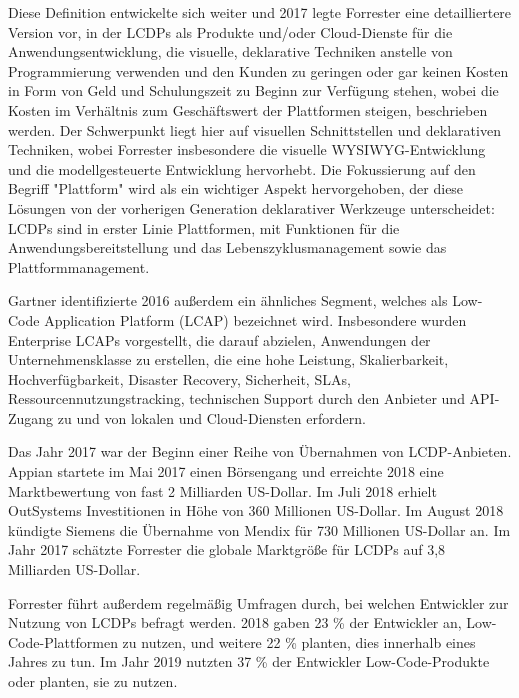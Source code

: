 \documentclass[12pt]{article} %
\begin{document}
	Diese Definition entwickelte sich weiter und 2017 legte Forrester eine detailliertere Version vor, in der LCDPs als Produkte und/oder Cloud-Dienste für die Anwendungsentwicklung, die visuelle, deklarative Techniken anstelle von Programmierung verwenden und den Kunden zu geringen oder gar keinen Kosten in Form von Geld und Schulungszeit zu Beginn zur Verfügung stehen, wobei die Kosten im Verhältnis zum Geschäftswert der Plattformen steigen, beschrieben werden. 
	Der Schwerpunkt liegt hier auf visuellen Schnittstellen und deklarativen Techniken, wobei Forrester insbesondere die visuelle WYSIWYG-Entwicklung und die modellgesteuerte Entwicklung hervorhebt. Die Fokussierung auf den Begriff "Plattform" wird als ein wichtiger Aspekt hervorgehoben, der diese Lösungen von der vorherigen Generation deklarativer Werkzeuge unterscheidet: LCDPs sind in erster Linie Plattformen, mit Funktionen für die Anwendungsbereitstellung und das Lebenszyklusmanagement sowie das Plattformmanagement.\cite{DiRuscio.2022}\newline
	
	Gartner identifizierte 2016 außerdem ein ähnliches Segment, welches als Low-Code Application Platform (LCAP) bezeichnet wird. Insbesondere wurden Enterprise LCAPs vorgestellt, die darauf abzielen, Anwendungen der Unternehmensklasse zu erstellen, die eine hohe Leistung, Skalierbarkeit, Hochverfügbarkeit, Disaster Recovery, Sicherheit, SLAs, Ressourcennutzungstracking, technischen Support durch den Anbieter und API-Zugang zu und von lokalen und Cloud-Diensten erfordern.\cite{DiRuscio.2022} \newline %
	
	Das Jahr 2017 war der Beginn einer Reihe von Übernahmen von LCDP-Anbieten. Appian startete im Mai 2017 einen Börsengang und erreichte 2018 eine Marktbewertung von fast 2 Milliarden US-Dollar. Im Juli 2018 erhielt OutSystems Investitionen in Höhe von 360 Millionen US-Dollar. Im August 2018 kündigte Siemens die Übernahme von Mendix für 730 Millionen US-Dollar an. Im Jahr 2017 schätzte Forrester die globale Marktgröße für LCDPs auf 3,8 Milliarden US-Dollar. \cite{DiRuscio.2022}\newline 
		
	Forrester führt außerdem regelmäßig Umfragen durch, bei welchen Entwickler zur Nutzung von LCDPs befragt werden. 2018 gaben 23 \% der Entwickler an, Low-Code-Plattformen zu nutzen, und weitere 22 \% planten, dies innerhalb eines Jahres zu tun. Im Jahr 2019 nutzten 37 \% der Entwickler Low-Code-Produkte oder planten, sie zu nutzen. \cite{DiRuscio.2022}\newline
	
\end{document}
